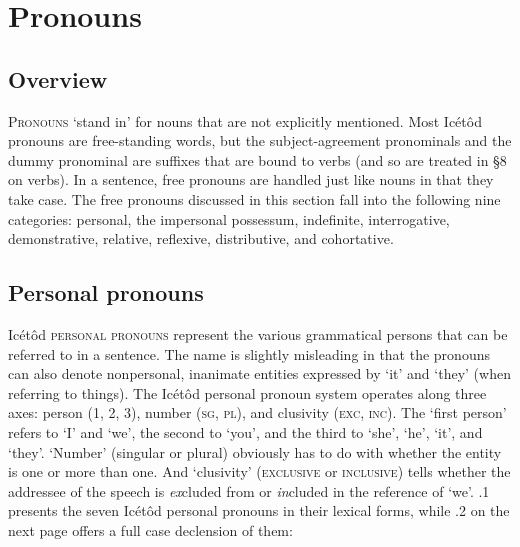 \section{Pronouns}



\subsection{Overview}


\textsc{Pronouns} ‘stand in’ for nouns that are not explicitly mentioned. Most Icétôd pronouns are free-standing words, but the subject-agreement pronominals and the dummy pronominal are suffixes that are bound to verbs (and so are treated in §8 on verbs). In a sentence, free pronouns are handled just like nouns in that they take case. The free pronouns discussed in this section fall into the following nine categories: personal, the impersonal possessum, indefinite, interrogative, demonstrative, relative, reflexive, distributive, and cohortative.




\subsection{Personal pronouns}


Icétôd \textsc{personal pronouns} represent the various grammatical persons that can be referred to in a sentence. The name is slightly misleading in that the pronouns can also denote nonpersonal, inanimate entities expressed by ‘it’ and ‘they’ (when referring to things). The Icétôd personal pronoun system operates along three axes: person (1, 2, 3), number (\textsc{sg}, \textsc{pl}), and clusivity (\textsc{exc}, \textsc{inc}). The ‘first person’ refers to ‘I’ and ‘we’, the second to ‘you’, and the third to ‘she’, ‘he’, ‘it’, and ‘they’. ‘Number’ (singular or plural) obviously has to do with whether the entity is one or more than one. And ‘clusivity’ (\textsc{exclusive} or \textsc{inclusive}) tells whether the addressee of the speech is \textit{ex}cluded from or \textit{in}cluded in the reference of ‘we’. .1 presents the seven Icétôd personal pronouns in their lexical forms, while .2 on the next page offers a full case declension of them:


